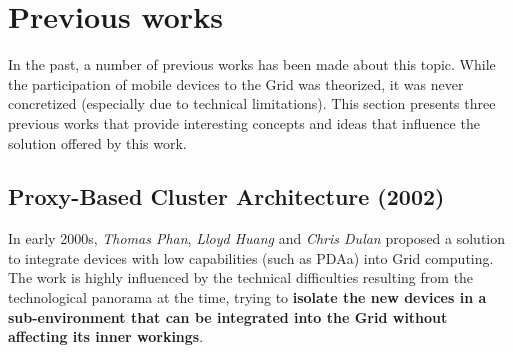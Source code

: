 \section{Previous works}
In the past, a number of previous works has been made about this topic. While the participation of mobile devices to the Grid was theorized, it was never concretized (especially due to technical limitations). This section presents three previous works that provide interesting concepts and ideas that influence the solution offered by this work.

\subsection{Proxy-Based Cluster Architecture (2002)}
In early 2000s, \textit{Thomas Phan}, \textit{Lloyd Huang} and \textit{Chris Dulan} proposed a solution to integrate devices with low capabilities (such as PDAa) into Grid computing. The work is highly influenced by the technical difficulties resulting from the technological panorama at the time, trying to \textbf{isolate the new devices in a sub-environment that can be integrated into the Grid without affecting its inner workings}.

